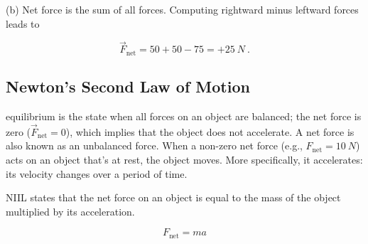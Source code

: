 \documentclass[main.tex]{subfiles}
\begin{document}
\begin{center}
    
\end{center}

(b) Net force is the sum of all forces. Computing rightward minus leftward forces leads to
\vspace{-1em}

\begin{equation*}
    \vec{F}_{\text{net}} = 50 + 50 - 75 = +\SI{25}{N}\ .
\end{equation*}

\solutionEnd

\vspace{1em}

\subsection{Newton's Second Law of Motion} \label{kkBUgj}

\Gls{equilibrium} is the state when all forces on an object are balanced; the net force is zero ($\vec{F}_{\text{net}} = 0$), which implies that the object does not accelerate. A net force is also known as an unbalanced force. When a non-zero net force (e.g., $F_{\text{net}} = \SI{10}{N}$) acts on an object that's at rest, the object moves. More specifically, it accelerates: its velocity changes over a period of time.


\gls{NIIL} states that the net force on an object is equal to the mass of the object multiplied by its acceleration.

\begin{equation} \label{eq:NewtonIILaw} 
    F_{\mathrm{net}} = ma
\end{equation}
\end{document}

